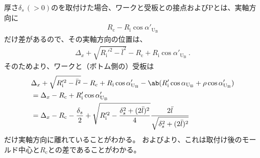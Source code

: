 \clearpage
\expandafterindex{\yomiSpacerThickness@\nameSpacerThickness}厚さ$\delta_s\,(>0)$の\Spacer を取付けた場合、ワークと受板との接点および\TableCenter Pとは、実軸方向に
\begin{align*}
  R_\mathrm c-R_\mathrm i\cos\alpha'_{\mathrm U_\mathrm B}
\end{align*}
だけ差があるので、その実軸方向の位置は、
\begin{align*}
  \Delta_x+\sqrt{R_\mathrm i'^2-\bar l^2}-R_\mathrm c+R_\mathrm i\cos\alpha'_{\mathrm U_\mathrm B}\ .
\end{align*}
そのためより、ワークと（ボトム側の）受板は
\begin{align*}
  &  \Delta_x+\sqrt{R_\mathrm i'^2-\bar l^2}-R_\mathrm c+R_\mathrm i\cos\alpha'_{\mathrm U_\mathrm B}
     -\ab(R_\mathrm i'\cos\alpha_{\mathrm U_\mathrm B}+\rho\cos\alpha'_{\mathrm U_\mathrm B})\\
  &= \Delta_x-R_\mathrm c+R_\mathrm i'\cos\alpha'_{\mathrm U_\mathrm B}\\
  &= \Delta_x-R_\mathrm c
     -\frac{\delta_s}2+\sqrt{R_\mathrm i'^2-\frac{\delta_s^2+(2\bar l)^2}4}\frac{2\bar l}{\sqrt{\delta_s^2+(2\bar l)^2}}
\end{align*}
だけ実軸方向に離れていることがわかる。
およびより、これは\Spacer 取付け後のモールド中心と\CenterCurvature$R_\mathrm c$との差であることがわかる。
